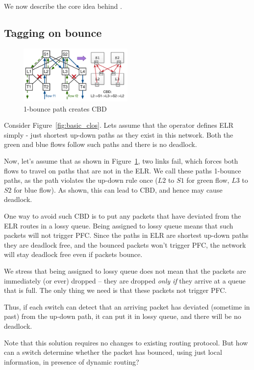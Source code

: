 We now describe the core idea behind \sysname{}.

\subsection{Tagging on bounce}
\label{subsec:tag}

\begin{figure}[t]
	\centering
	\includegraphics[width=0.5\textwidth] {figs/cbd_a}
	\caption{1-bounce path creates CBD}
	\label{fig:clos_1_bounce}
\end{figure}

Consider Figure~\ref{fig:basic_clos}. Lets assume that the operator defines ELR
simply - just shortest up-down paths as they exist in this network.  Both the
green and blue flows follow such paths and there is no deadlock.

Now, let's assume that as shown in Figure~\ref{fig:clos_1_bounce}, two links
fail, which forces both flows to travel on paths that are not in the ELR. We
call these paths 1-bounce paths, as the path violates the up-down rule once
($L2$ to $S1$ for green flow, $L3$ to $S2$ for blue flow). As shown, this can
lead to CBD, and hence may cause deadlock.

One way to avoid such CBD is to put any packets that have deviated from the ELR
routes in a lossy queue.  Being assigned to lossy queue means that such packets
will not trigger PFC. Since the paths in ELR are shortest up-down paths they are
deadlock free, and the bounced packets won't trigger PFC, the network will stay
deadlock free even if packets bounce.

We stress that being assigned to lossy queue does not mean that the packets are
immediately (or ever) dropped -- they are dropped {\em only if} they arrive at a
queue that is full. The only thing we need is that these packets not trigger
PFC.

Thus, if each switch can detect that an arriving packet has deviated (sometime
in past) from the up-down path, it can put it in lossy queue, and there will be
no deadlock.

Note that this solution requires no changes to existing routing protocol.  But
how can a switch determine whether the packet has bounced, using just local
information, in presence of dynamic routing?


